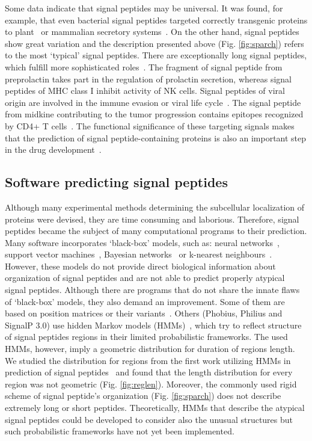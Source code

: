 \documentclass[fleqn,10pt,twoside]{gcb15submission}
\begin{document}
Some data indicate that signal peptides may be universal. It was found, for example, that even bacterial signal peptides targeted correctly transgenic proteins to plant~\citep{2009moellera} or mammalian secretory systems~\citep{2014naganoestablishment}. On the other hand, signal peptides show great variation and the description presented above (Fig. \ref{fig:sparch}) refers to the most ‘typical’ signal peptides. There are  exceptionally long signal peptides, which fulfill more sophisticated roles~\citep{2009hissarchitecture}. The fragment of signal peptide from preprolactin takes part in the regulation of prolactin secretion, whereas signal peptides of MHC class I inhibit activity of NK cells. Signal peptides of viral origin are involved in the immune evasion or viral life cycle~\citep{2000kappposttargeting}. The signal peptide from midkine contributing to the tumor progression contains epitopes recognized by CD4+ T cells~\citep{2013kerzerhothe}. The functional significance of these targeting signals makes that the prediction of signal peptide-containing proteins is also an important step in the drug development~\citep{2005zhangalteration, 2012netoadeimproving, 2010moellerwetmilling}.


\subsection*{Software predicting signal peptides}

Although many experimental methods determining the subcellular localization of proteins were devised, they are time consuming and laborious. Therefore, signal peptides became the subject of many computational programs to their prediction. Many software incorporates ‘black-box’ models, such as: neural networks~\citep{2011petersensignalp}, support vector machines~\citep{2014zhangprediction}, Bayesian networks~\citep{2012zhengsignalbnf} or k-nearest neighbours~\citep{2007shensignall}. However, these models do not provide direct biological information about organization of signal peptides and are not able to predict properly atypical signal peptides. Although there are programs that do not share the innate flaws of ‘black-box’ models, they also demand an improvement. Some of them are based on position matrices or their variants~\citep{2014zhangprediction, 2004hillerpredisi}. Others (Phobius, Philius and SignalP 3.0) use hidden Markov models (HMMs)~\citep{2004klla, 2008reynoldstransmembrane, 2004bendtsenimproved}, which try to reflect structure of signal peptides regions in their limited probabilistic frameworks. The used HMMs, however, imply a geometric distribution for duration of regions length. We studied the distribution for regions from the first work utilizing HMMs in prediction of signal peptides~\citep{1998nielsenprediction} and found that the length distribution for every region was not geometric (Fig. \ref{fig:reglen}). Moreover, the commonly used rigid scheme of signal peptide's organization (Fig. \ref{fig:sparch}) does not describe extremely long or short peptides. Theoretically, HMMs that describe the atypical signal peptides could be developed to consider also the unusual structures but such probabilistic frameworks have not yet been implemented.
\end{document}
